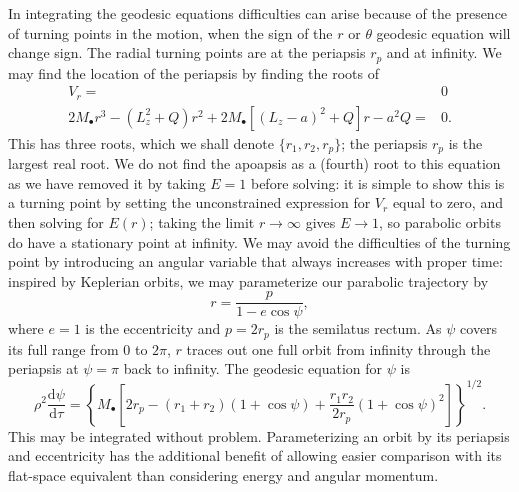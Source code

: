\documentclass[a4paper, 11pt, titlepage, twoside]{report}
\newcommand{\dd}{\ensuremath{\mathrm{d}}}
\newcommand{\diff}[2]{\ensuremath{\frac{\dd {#1}}{\dd {#2}}}}
\begin{document}
In integrating the geodesic equations difficulties can arise because of the presence of turning points in the motion, when the sign of the $r$ or $\theta$ geodesic equation will change sign. The radial turning points are at the periapsis $r_p$ and at infinity. We may find the location of the periapsis by finding the roots of
\begin{align}
V_r = {} & 0 \nonumber \\
2M_\bullet r^3 - \left(L_z^2+Q\right)r^2 + 2M_\bullet\left[\left(L_z - a\right)^2 + Q\right]r - a^2Q= {} & 0.
\end{align}
This has three roots, which we shall denote $\{r_1, r_2, r_p\}$; the periapsis $r_p$ is the largest real root. We do not find the apoapsis as a (fourth) root to this equation as we have removed it by taking $E = 1$ before solving: it is simple to show this is a turning point by setting the unconstrained expression for $V_r$ equal to zero, and then solving for $E(r)$; taking the limit $r \rightarrow \infty$ gives $E \rightarrow 1$, so parabolic orbits do have a stationary point at infinity\cite{Wilkins1972}. We may avoid the difficulties of the turning point by introducing an angular variable that always increases with proper time\cite{Drasco2004}: inspired by Keplerian orbits, we may parameterize our parabolic trajectory by
\begin{equation}
r = \frac{p}{1-e\cos\psi},
\end{equation}
where $e = 1$ is the eccentricity and $p = 2r_p$ is the semilatus rectum. As $\psi$ covers its full range from $0$ to $2\pi$, $r$ traces out one full orbit from infinity through the periapsis at $\psi = \pi$ back to infinity. The geodesic equation for $\psi$ is
\begin{equation}
\rho^2 \diff{\psi}{\tau} = \left\{M_\bullet\left[2r_p - \left(r_1 + r_2\right)\left(1 + \cos\psi\right) + \frac{r_1 r_2}{2r_p}\left(1 + \cos\psi\right)^2\right]\right\}^{1/2}.
\end{equation}
This may be integrated without problem. Parameterizing an orbit by its periapsis and eccentricity has the additional benefit of allowing easier comparison with its flat-space equivalent than considering energy and angular momentum\cite{Gair2005}.
\end{document}
